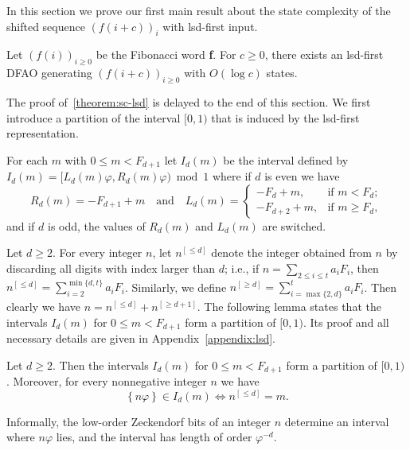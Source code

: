 \documentclass[12pt,runningheads]{llncs}
\renewcommand{\phi}{\varphi}
\newcommand{\fract}[1]{\left\{ #1 \right\}}
\begin{document}
In this section we prove our first main result about the state complexity of the shifted sequence $(f(i+c))_i$ with lsd-first input. 
\begin{theorem} \label{theorem:sc-lsd}
    Let $(f(i))_{i \geq 0}$ be the Fibonacci word {\bf f}. For $c \geq 0$, there exists an lsd-first DFAO generating $(f(i+c))_{i \geq 0}$ with $O(\log c)$ states. 
\end{theorem} 


The proof of~\cref{theorem:sc-lsd} is delayed to the end of this section. We first introduce a partition of the interval $[0,1)$ that is induced by the lsd-first representation. 


\begin{definition} \label{def:I_d(m)}
For each $m$ with $0\leq m < F_{d+1}$ let $I_d(m)$ be the interval defined by $I_d(m)= [L_d(m) \phi, R_d(m) \phi) \bmod 1$ where if $d$ is even we have
\[
	R_d(m) = - F_{d+1} + m 
	\quad \text{and} \quad
	L_d(m) = \begin{cases}
		-F_d + m, &\text{if } m < F_d;\\
		- F_{d+2} + m, &\text{if } m \geq F_d,
	\end{cases}
\]
and if $d$ is odd, the values of $R_d(m)$ and $L_d(m)$ are switched.  
\end{definition}

Let $d\geq 2$. For every integer $n$,  let $n^{[\leq d]}$
denote the integer obtained from $n$ by discarding all digits with index larger than $d$; i.e., if $n = \sum_{2\leq i \leq t} a_i F_i$, then $n^{[\leq d]} = \sum_{i=2}^{\min\{d,t\}} a_i F_i$. Similarly, we define $n^{[\geq d]} = \sum_{i=\max\{2,d\}}^{t} a_i F_i$. Then clearly we have $n = n^{[\leq d]} + n^{[\geq d+1]}$.  The following lemma states that the intervals $I_d(m)$ for $0\leq m < F_{d+1}$ form a partition of $[0,1)$. Its proof and all necessary details are given in Appendix~\ref{appendix:lsd}. 

\begin{lemma}\label{lem:lsd-partition}
Let $d\geq 2$. Then the intervals $I_d(m)$ for $0\leq m < F_{d+1}$ form a partition of $[0,1)$.
Moreover, for every nonnegative integer $n$ we have
\begin{equation}\label{eq:partition_char}
    \fract{n\phi}\in I_d(m)
    \iff n^{[\leq d]} = m.
\end{equation}
\end{lemma}
Informally, the low-order Zeckendorf bits of an integer $n$ determine an interval where $n\phi$ lies, and the interval has length of order $\phi^{-d}$. 
\end{document}
